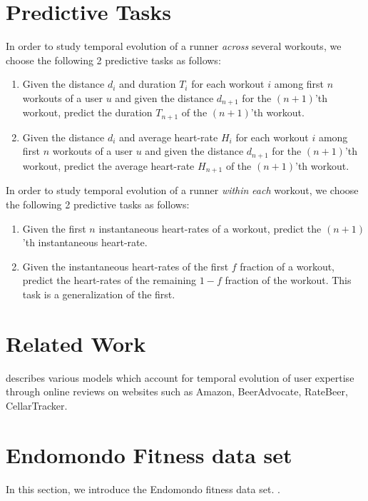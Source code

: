 \documentclass{acm_proc_article-sp}
\begin{document}
\section{Predictive Tasks}
In order to study temporal evolution of a runner \emph{across} several workouts, we choose the following 2 predictive tasks as follows:
\begin{enumerate}
\item Given the distance $d_i$ and duration $T_i$ for each workout $i$ among first $n$ workouts of a user $u$ and given the distance $d_{n+1}$ for the $(n+1)$'th workout, predict the duration $T_{n+1}$ of the $(n+1)$'th workout.
\item Given the distance $d_i$ and average heart-rate $H_i$ for each workout $i$ among first $n$ workouts of a user $u$ and given the distance $d_{n+1}$ for the $(n+1)$'th workout, predict the average heart-rate $H_{n+1}$ of the $(n+1)$'th workout.
\end{enumerate}

In order to study temporal evolution of a runner \emph{within} \emph{each} workout, we choose the following 2 predictive tasks as follows:

\begin{enumerate}
\item Given the first $n$ instantaneous heart-rates of a workout, predict the $(n+1)$'th instantaneous heart-rate.
\item Given the instantaneous heart-rates of the first $f$ fraction of a workout, predict the heart-rates of the remaining $1-f$ fraction of the workout. This task is a generalization of the first.
\end{enumerate}

\section{Related Work}
\cite{www13} describes various models which account for temporal evolution of user expertise through online reviews on websites such as Amazon, BeerAdvocate, RateBeer, CellarTracker. 

\section{Endomondo Fitness data set}
\label{expAnalysis}
In this section, we introduce the Endomondo fitness data set. \cite{mldataset}. 

\begin{comment}
\begin{figure}[h]
\centering
\texttt{[image: plots/rating\_vs\_age]}
\caption{\label{plotRatingVsAge}Average rating for different age groups}
\end{figure}

\begin{figure*}
\centering
\texttt{[image: plots/rating\_vs\_occupation]}
\caption{\label{plotRatingVsOcc} Average rating for various occupations}
\end{figure*}
\end{comment}
\end{document}
